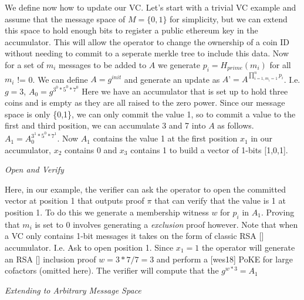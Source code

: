 \documentclass[11pt]{article}
\begin{document}
We define now how to update our VC. Let’s start with a trivial VC example and assume that the message space of $M = \{0,1\}$ for simplicity, but we can extend this space to hold enough bits to register a public ethereum key in the accumulator. This will allow the operator to change the ownership of a coin ID without needing to commit to a seperate merkle tree to include this data. Now for a set of $m_i$ messages to be added to $A$ we generate $p_i = H_{prime}(m_i)$ for all $m_i$ != 0. We can define $A=g^{init}$ and generate an update as $A’ = A^{\prod_{i=1, m_i=1}^{n}p_i}$. I.e. $g=3$, $A_0=g^{3^0*5^0*7^0}$ Here we have an accumulator that is set up to hold three coins and is empty as they are all raised to the zero power. Since our message space is only \{0,1\}, we can only commit the value 1, so to commit a value to the first and third position, we can accumulate 3 and 7 into $A$ as follows.  $A_1 = A_0^{3^1*5^0*7^1}$.  Now $A_1$ contains the value 1 at the first position $x_1$ in our accumulator, $x_2$ contains 0 and $x_3$ contains 1 to build a vector of 1-bits [1,0,1].
\\

\centerline{\textit{Open and Verify}}

Here, in our example, the verifier can ask the operator to open the committed vector at position 1 that outputs proof $\pi$ that can verify that the value is 1 at position 1. To do this we generate a membership witness $w$ for $p_i$ in $A_1$. Proving that $m_i$ is set to 0 involves generating a \textit{exclusion} proof however. Note that when a VC only contains 1-bit messages it takes on the form of classic RSA [] accumulator. I.e. Ask to open position 1. Since $x_1 = 1$ the operator will generate an RSA [] inclusion proof $w= 3*7/7 = 3$ and perform a [wes18] PoKE for large cofactors (omitted here). The verifier will compute that the $g^{w*3} = A_1$ 
\\

\centerline{\textit{Extending to Arbitrary Message Space}}
\end{document}
